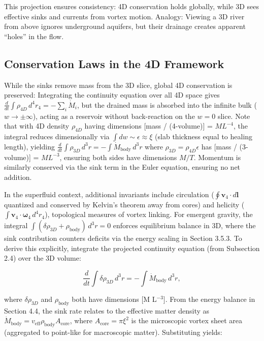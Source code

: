 This projection ensures consistency: 4D conservation holds globally, while 3D sees effective sinks and currents from vortex motion. Analogy: Viewing a 3D river from above ignores underground aquifers, but their drainage creates apparent ``holes'' in the flow.

\subsection{Conservation Laws in the 4D Framework}

While the sinks remove mass from the 3D slice, global 4D conservation is preserved: Integrating the continuity equation over all 4D space gives $\frac{d}{dt} \int \rho_{4D} \, d^4 r_4 = -\sum_i \dot{M}_i$, but the drained mass is absorbed into the infinite bulk ($w \to \pm \infty$), acting as a reservoir without back-reaction on the $w=0$ slice. Note that with 4D density $\rho_{4D}$ having dimensions [mass / (4-volume)] = $M L^{-4}$, the integral reduces dimensionally via $\int dw \sim \epsilon \approx \xi$ (slab thickness equal to healing length), yielding $\frac{d}{dt} \int \rho_{3D} \, d^3 r = -\int \dot{M}_{\text{body}} \, d^3 r$ where $\rho_{3D} = \rho_{4D} \epsilon$ has [mass / (3-volume)] = $M L^{-3}$, ensuring both sides have dimensions $M / T$. Momentum is similarly conserved via the sink term in the Euler equation, ensuring no net addition.

In the superfluid context, additional invariants include circulation ($\oint \mathbf{v}_4 \cdot d\mathbf{l}$ quantized and conserved by Kelvin's theorem away from cores) and helicity ($\int \mathbf{v}_4 \cdot \boldsymbol{\omega}_4 \, d^4 r_4$), topological measures of vortex linking. For emergent gravity, the integral $\int (\delta\rho_{3D} + \rho_{\text{body}}) \, d^3 r = 0$ enforces equilibrium balance in 3D, where the sink contribution counters deficits via the energy scaling in Section 3.5.3. To derive this explicitly, integrate the projected continuity equation (from Subsection 2.4) over the 3D volume:

\[
\frac{d}{dt} \int \delta\rho_{3D} \, d^3 r = - \int \dot{M}_{\text{body}} \, d^3 r,
\]

where $\delta\rho_{3D}$ and $\rho_{\text{body}}$ both have dimensions [M L$^{-3}$]. From the energy balance in Section 4.4, the sink rate relates to the effective matter density as $\dot{M}_{\text{body}} = v_{\text{eff}} \rho_{\text{body}} A_{\text{core}}$, where $A_{\text{core}} = \pi \xi^2$ is the microscopic vortex sheet area (aggregated to point-like for macroscopic matter). Substituting yields:

